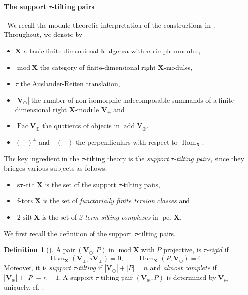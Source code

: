 \documentclass[11pt,reqno]{amsart}
\theoremstyle{plain}
\theoremstyle{definition}
\newtheorem{definition}[theorem]{Definition}
\numberwithin{equation}{section}
\newcommand\<{\langle}
\renewcommand\>{\rangle}
\newcommand\Add{\operatorname{add}}
\newcommand\Hom{\operatorname{Hom}}
\newcommand{\per}{\operatorname{per}} %
\renewcommand{\k}{\mathbf{k}}
\newcommand{\on}[1]{\operatorname{#1}}
\newcommand{\pcts}[1]{\mathbf{#1}}%
\newcommand{\pcto}[1]{\mathbf{#1}_\oplus} %
\begin{document}
\paragraph{\textbf{The support $\tau$-tilting pairs}}\
We recall the module-theoretic interpretation of the constructions in
\Cref{sec:suppBgz}. 
Throughout, we denote by
\begin{itemize}
    \item $\pcts{X}$ a basic finite-dimensional $\k$-algebra with $n$ simple modules,
    \item $\on{mod}\pcts{X}$ the category of finite-dimensional right $\pcts{X}$-modules,
    \item $\tau$ the Auslander-Reiten translation,
    \item $|\pcto{V}|$ the number of non-isomorphic indecomposable summands of a finite dimensional right $\pcts{X}$-module $\pcto{V}$ and 
    \item $\on{Fac}\pcto{V}$ the quotients of objects in $\Add \pcto{V}$.
    \item $(-)^\perp$ and ${^\perp}(-)$ the  perpendiculars with respect to $\Hom_\pcts{X}$.
\end{itemize}
The key ingredient in the $\tau$-tilting theory is the \emph{support $\tau$-tilting pairs}, since they bridges various subjects as follows.
\begin{itemize}
    \item $\on{s\tau-tilt}\pcts{X}$ is the set of the support $\tau$-tilting pairs,
    \item $\on{f-tors}\pcts{X}$ is the set of \emph{functorially finite torsion classes} and
    \item $\on{2-silt}\pcts{X}$ is the set of \emph{2-term silting complexes} in $\per\pcts{X}$.
\end{itemize}

We first recall the definition of the support $\tau$-tilting pairs.

\begin{definition}[{\cite[\S2]{AIR}}]\label{def:app-tau-pair}
    A pair $(\pcto{V},P)$ in $\on{mod}\pcts{X}$ with $P$ projective, is \emph{$\tau$-rigid} if
    \[
     \Hom_\pcts{X}(\pcto{V},\tau \pcto{V})=0,\qquad \Hom_\pcts{X}(P,\pcto{V})=0.
    \]
    Moreover, it is \emph{support $\tau$-tilting} if $|\pcto{V}|+|P|=n$ and \emph{almost complete} if $|\pcto{V}|+|P|=n-1$.
    A support $\tau$-tilting pair $(\pcto{V},P)$ is determined by $\pcto{V}$ uniquely, cf. \cite[Prop.~2.3]{AIR}.
\end{definition}
\end{document}
